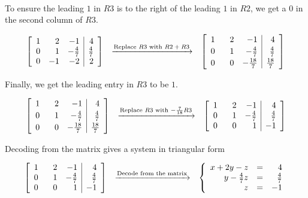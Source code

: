 \documentclass{ximera}
\begin{document}
\begin{ex}
\[\begin{array}{ccc}
\end{array}\]

To ensure the leading $1$ in $R3$ is to the right of the leading $1$ in $R2$, we get a $0$ in the second column of $R3$.

\[ \begin{array}{ccc}

\left[ \begin{array}{rrr|r} 
1 & 2 & -1 & 4 \\ 
0 & 1 & -\frac{4}{7} & \frac{4}{7} \\ 
0 & -1 & -2 & 2 \\ 
\end{array} \right]  
& 
\xrightarrow{\text{Replace $R3$ with $R2+R3$}} 
&  
\left[ \begin{array}{rrr|r} 
1 & \hphantom{-}2 & -1 & 4 \\ [2pt]
0 & 1 & -\frac{4}{7} & \frac{4}{7} \\ [2pt]
0 & 0 & -\frac{18}{7} & \frac{18}{7} \\ 
\end{array} \right]


\end{array}\]

Finally, we get the leading entry in $R3$ to be $1$.

\[\begin{array}{ccc}

\left[ \begin{array}{rrr|r} 
1 & \hphantom{-}2 & -1 & 4 \\ [2pt]
0 & 1 & -\frac{4}{7} & \frac{4}{7} \\ [2pt]
0 & 0 & -\frac{18}{7} & \frac{18}{7} \\ 
\end{array} \right]   
& 
\xrightarrow{\text{Replace $R3$ with $-\frac{7}{18}R3$}} 
& 
\left[ \begin{array}{rrr|r} 
1 & \hphantom{-}2 & -1 & 4 \\ 
0 & 1 & -\frac{4}{7} & \frac{4}{7} \\ 
0 & 0 &1 & -1 \\ 
\end{array} \right]

\end{array}\]

Decoding from the matrix gives a system in triangular form

\[ \begin{array}{ccc}

\left[ \begin{array}{rrr|r} 
1 & \hphantom{-}2 & -1 & 4 \\ 
0 & 1 & -\frac{4}{7} & \frac{4}{7} \\ 
0 & 0 &1 & -1 \\ 
\end{array} \right]  
& 
\xrightarrow{\text{Decode from the matrix}} 
& 
\left \{ \begin{array}{rcr} 
x + 2y-z & = & 4 \\ 
y - \frac{4}{7} z & = & \frac{4}{7} \\ 
z & = & -1 \end{array} \right.


\end{array}\]
\end{ex}
\end{document}

